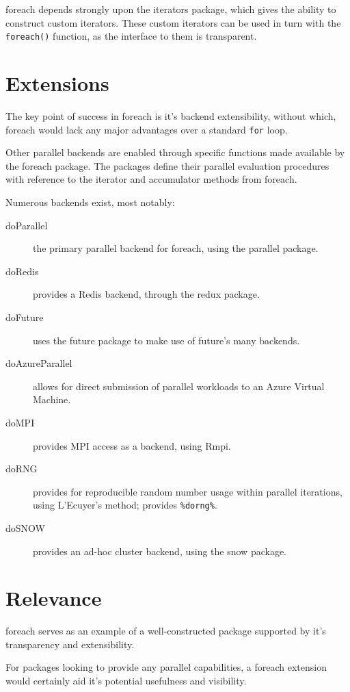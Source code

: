 \documentclass[a4paper,10pt]{article}
\begin{document}
foreach depends strongly upon the iterators package, which gives the
ability to construct custom iterators. These custom iterators can be
used in turn with the \texttt{foreach()} function, as the interface to
them is transparent.

\section{Extensions}
\label{sec:extensions}

The key point of success in foreach is it's backend extensibility,
without which, foreach would lack any major advantages over a standard
\texttt{for} loop.

Other parallel backends are enabled through specific functions made
available by the foreach package. The packages define their parallel
evaluation procedures with reference to the iterator and accumulator
methods from foreach.

Numerous backends exist, most notably:
\begin{description}
	\item[doParallel] the primary parallel backend for foreach, using the
	      parallel package\cite{corporation19}.
	\item[doRedis]  provides a Redis backend, through the redux package\cite{lewis20}.
	\item[doFuture] uses the future package to make use of future's many
	      backends\cite{bengtsson20do}.
	\item[doAzureParallel] allows for direct submission of parallel
	      workloads to an Azure Virtual Machine\cite{hoang20}.
	\item[doMPI] provides MPI access as a backend, using Rmpi\cite{weston17}.
	\item[doRNG] provides for reproducible random number usage within
	      parallel iterations, using L'Ecuyer's method; provides
	      \texttt{\%dorng\%}\cite{gaujoux20}.
	\item[doSNOW] provides an ad-hoc cluster backend, using the snow
	      package\cite{dosnow19}.
\end{description}

\section{Relevance}
\label{sec:relevance}

foreach serves as an example of a well-constructed package supported
by it's transparency and extensibility.

For packages looking to provide any parallel capabilities, a foreach
extension would certainly aid it's potential usefulness and
visibility.

\printbibliography{}
\end{document}
